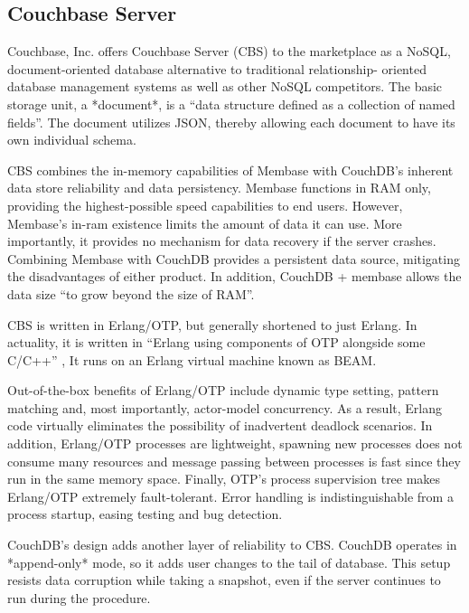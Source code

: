 \subsection{Couchbase Server}

     Couchbase, Inc. offers Couchbase Server (CBS) to the marketplace
     as a NoSQL, document-oriented database alternative to traditional
     relationship- oriented database management systems as well as
     other NoSQL competitors.  The basic storage unit, a *document*,
     is a ``data structure defined as a collection of named fields''.
     The document utilizes JSON, thereby allowing each document to
     have its own individual schema. \cite{www-infoworld-cbs}

     CBS combines the in-memory capabilities of Membase with CouchDB's
     inherent data store reliability and data persistency.  Membase
     functions in RAM only, providing the highest-possible speed
     capabilities to end users.  However, Membase's in-ram existence
     limits the amount of data it can use.  More importantly, it
     provides no mechanism for data recovery if the server crashes.
     Combining Membase with CouchDB provides a persistent data source,
     mitigating the disadvantages of either product.  In addition,
     CouchDB + membase allows the data size ``to grow beyond the size
     of RAM''.  \cite{www-safaribooks-cbs}

     CBS is written in Erlang/OTP, but generally shortened to just
     Erlang.  In actuality, it is written in ``Erlang using components
     of OTP alongside some C/C++'' \cite{www-erlangcentral-cbs}, It
     runs on an Erlang virtual machine known as
     BEAM. \cite{www-wikipedia-erlang-cbs}

     Out-of-the-box benefits of Erlang/OTP include dynamic type
     setting, pattern matching and, most importantly, actor-model
     concurrency.  As a result, Erlang code virtually eliminates the
     possibility of inadvertent deadlock scenarios.  In addition,
     Erlang/OTP processes are lightweight, spawning new processes does
     not consume many resources and message passing between processes
     is fast since they run in the same memory space.  Finally, OTP's
     process supervision tree makes Erlang/OTP extremely
     fault-tolerant.  Error handling is indistinguishable from a
     process startup, easing testing and bug detection.
     \cite{www-couchbase-blog-cbs}

     CouchDB's design adds another layer of reliability to CBS.
     CouchDB operates in *append-only* mode, so it adds user changes
     to the tail of database.  This setup resists data corruption
     while taking a snapshot, even if the server continues to run
     during the procedure.  \cite{www-hightower-cbs}

